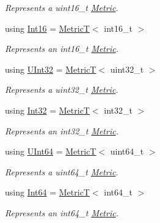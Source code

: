 \begin{DoxyCompactItemize}
\begin{DoxyCompactList}\small\item\em Represents a {\ttfamily uint16\+\_\+t} \hyperlink{classdg_1_1deepcore_1_1_metric}{Metric}. \end{DoxyCompactList}\item 
using \hyperlink{group___process_metrics_gaa7db3a7893443501f99763fcc0e861ac}{Int16} = \hyperlink{structdg_1_1deepcore_1_1_metric_t}{MetricT}$<$ int16\+\_\+t $>$
\begin{DoxyCompactList}\small\item\em Represents an {\ttfamily int16\+\_\+t} \hyperlink{classdg_1_1deepcore_1_1_metric}{Metric}. \end{DoxyCompactList}\item 
using \hyperlink{group___process_metrics_gab9fce2fcdfa656ff597d286163c3e220}{U\+Int32} = \hyperlink{structdg_1_1deepcore_1_1_metric_t}{MetricT}$<$ uint32\+\_\+t $>$
\begin{DoxyCompactList}\small\item\em Represents a {\ttfamily uint32\+\_\+t} \hyperlink{classdg_1_1deepcore_1_1_metric}{Metric}. \end{DoxyCompactList}\item 
using \hyperlink{group___process_metrics_ga9092703cdbc8630f71539fc8c9f8802c}{Int32} = \hyperlink{structdg_1_1deepcore_1_1_metric_t}{MetricT}$<$ int32\+\_\+t $>$
\begin{DoxyCompactList}\small\item\em Represents an {\ttfamily int32\+\_\+t} \hyperlink{classdg_1_1deepcore_1_1_metric}{Metric}. \end{DoxyCompactList}\item 
using \hyperlink{group___process_metrics_ga18c2b99cb1071590aa42afa19c39f7b9}{U\+Int64} = \hyperlink{structdg_1_1deepcore_1_1_metric_t}{MetricT}$<$ uint64\+\_\+t $>$
\begin{DoxyCompactList}\small\item\em Represents a {\ttfamily uint64\+\_\+t} \hyperlink{classdg_1_1deepcore_1_1_metric}{Metric}. \end{DoxyCompactList}\item 
using \hyperlink{group___process_metrics_ga97b1089cad8551af2bcb35e88a034469}{Int64} = \hyperlink{structdg_1_1deepcore_1_1_metric_t}{MetricT}$<$ int64\+\_\+t $>$
\begin{DoxyCompactList}\small\item\em Represents an {\ttfamily int64\+\_\+t} \hyperlink{classdg_1_1deepcore_1_1_metric}{Metric}. \end{DoxyCompactList}\item 

\end{DoxyCompactItemize}
